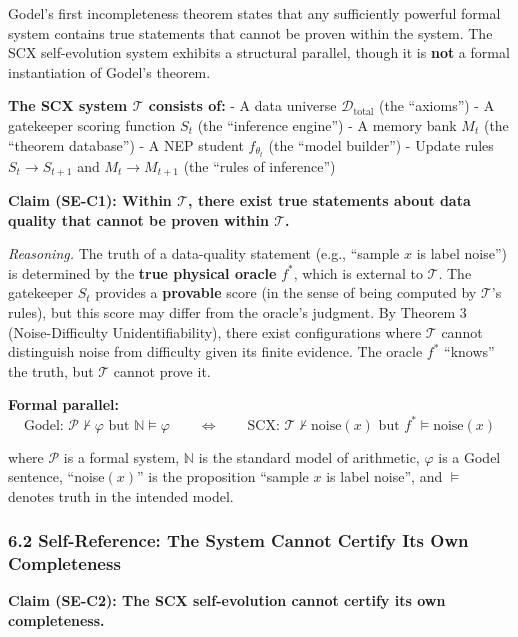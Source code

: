 \documentclass[
  12pt,
]{article}
\begin{document}
Godel's first incompleteness theorem states that any sufficiently
powerful formal system contains true statements that cannot be proven
within the system. The SCX self-evolution system exhibits a structural
parallel, though it is \textbf{not} a formal instantiation of Godel's
theorem.

\textbf{The SCX system \(\mathcal{T}\) consists of:} - A data universe
\(\mathcal{D}_{\text{total}}\) (the ``axioms'') - A gatekeeper scoring
function \(S_t\) (the ``inference engine'') - A memory bank \(M_t\) (the
``theorem database'') - A NEP student \(f_{\theta_t}\) (the ``model
builder'') - Update rules \(S_t \to S_{t+1}\) and \(M_t \to M_{t+1}\)
(the ``rules of inference'')

\textbf{Claim (SE-C1): Within \(\mathcal{T}\), there exist true
statements about data quality that cannot be proven within
\(\mathcal{T}\).}

\emph{Reasoning.} The truth of a data-quality statement (e.g., ``sample
\(x\) is label noise'') is determined by the \textbf{true physical
oracle} \(f^*\), which is external to \(\mathcal{T}\). The gatekeeper
\(S_t\) provides a \textbf{provable} score (in the sense of being
computed by \(\mathcal{T}\)'s rules), but this score may differ from the
oracle's judgment. By Theorem 3 (Noise-Difficulty Unidentifiability),
there exist configurations where \(\mathcal{T}\) cannot distinguish
noise from difficulty given its finite evidence. The oracle \(f^*\)
``knows'' the truth, but \(\mathcal{T}\) cannot prove it.

\textbf{Formal parallel:}
\[\text{Godel: } \mathcal{P} \nvdash \varphi \text{ but } \mathbb{N} \models \varphi \qquad \Longleftrightarrow \qquad \text{SCX: } \mathcal{T} \nvdash \text{noise}(x) \text{ but } f^* \models \text{noise}(x)\]

where \(\mathcal{P}\) is a formal system, \(\mathbb{N}\) is the standard
model of arithmetic, \(\varphi\) is a Godel sentence, ``noise\((x)\)''
is the proposition ``sample \(x\) is label noise'', and \(\models\)
denotes truth in the intended model.

\subsubsection{6.2 Self-Reference: The System Cannot Certify Its Own
Completeness}\label{self-reference-the-system-cannot-certify-its-own-completeness}

\textbf{Claim (SE-C2): The SCX self-evolution cannot certify its own
completeness.}
\end{document}
